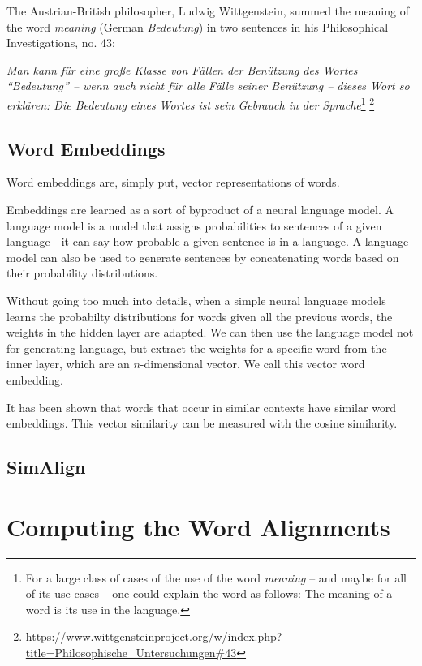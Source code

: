 The Austrian-British philosopher, Ludwig Wittgenstein, summed the meaning of the word \emph{meaning} (German \emph{Bedeutung}) in two sentences in his Philosophical Investigations, no. 43:


\begin{displayquote}\emph{
Man kann für eine große Klasse von Fällen der Benützung des Wortes \enquote{Bedeutung} – wenn auch nicht für alle Fälle seiner Benützung – dieses Wort so erklären: Die Bedeutung eines Wortes ist sein Gebrauch in der Sprache}\footnote{{For a large class of cases of the use of the word \emph{meaning} -- and maybe for all of its use cases -- one could explain the word as follows: The meaning of a word is its use in the language.}} \footnote{\url{https://www.wittgensteinproject.org/w/index.php?title=Philosophische_Untersuchungen\#43}}
\end{displayquote}


\subsection{Word Embeddings}

Word embeddings are, simply put, vector representations of words. 

Embeddings are learned as a sort of byproduct of a neural language model.
A language model is a model that assigns probabilities to sentences of a given language---it can say how probable a given sentence is in a language. 
A language model can also be used to generate sentences by concatenating words based on their probability distributions.

Without going too much into details, when a simple neural language models learns the probabilty distributions for words given all the previous words, the weights in the hidden layer are adapted. 
We can then use the language model not for generating language, but extract the weights for a specific word from the inner layer, which are an $n$-dimensional vector.
We call this vector word embedding.

It has been shown that words that occur in similar contexts have similar word embeddings. 
This vector similarity can be measured with the cosine similarity.

\subsection{SimAlign}


\section{Computing the Word Alignments}




